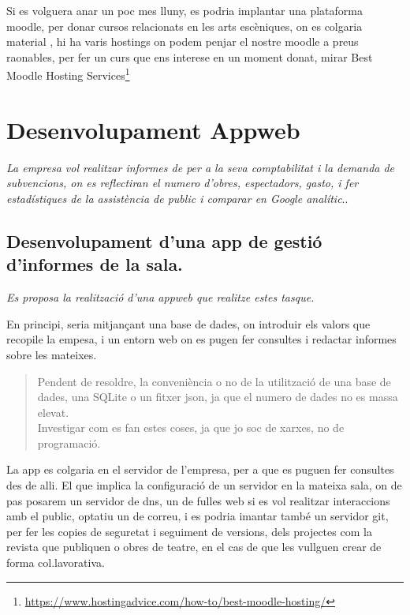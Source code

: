 \documentclass[
  10pt,
]{book}
\DeclareRobustCommand{\href}[2]{#2\footnote{\url{#1}}}
\begin{document}
Si es volguera anar un poc mes lluny, es podria implantar una plataforma moodle, per donar cursos relacionats en les arts escèniques, on es colgaria material , hi ha varis hostings on podem penjar el nostre moodle a preus raonables, per fer un curs que ens interese en un moment donat, mirar \href{https://www.hostingadvice.com/how-to/best-moodle-hosting/}{Best Moodle Hosting Services}

\hypertarget{desenvolupament-appweb}{%
\chapter{Desenvolupament Appweb}\label{desenvolupament-appweb}}

\emph{La empresa vol realitzar informes de per a la seva comptabilitat i la demanda de subvencions, on es reflectiran el numero d'obres, espectadors, gasto, i fer estadístiques de la assistència de public i comparar en Google analític}..

\hypertarget{desenvolupament-duna-app-de-gestiuxf3-dinformes-de-la-sala.}{%
\section{Desenvolupament d'una app de gestió d'informes de la sala.}\label{desenvolupament-duna-app-de-gestiuxf3-dinformes-de-la-sala.}}

\emph{Es proposa la realització d'una appweb que realitze estes tasque.}

En principi, seria mitjançant una base de dades, on introduir els valors que recopile la empesa, i un entorn web on es pugen fer consultes i redactar informes sobre les mateixes.

\begin{quote}
Pendent de resoldre, la conveniència o no de la utilització de una base de dades, una SQLite o un fitxer json, ja que el numero de dades no es massa elevat.\\
Investigar com es fan estes coses, ja que jo soc de xarxes, no de programació.
\end{quote}

La app es colgaria en el servidor de l'empresa, per a que es puguen fer consultes des de alli.
El que implica la configuració de un servidor en la mateixa sala, on de pas posarem un servidor de dns, un de fulles web si es vol realitzar interaccions amb el public, optatiu un de correu, i es podria imantar també un servidor git, per fer les copies de seguretat i seguiment de versions, dels projectes com la revista que publiquen o obres de teatre, en el cas de que les vullguen crear de forma col.lavorativa.
\end{document}
